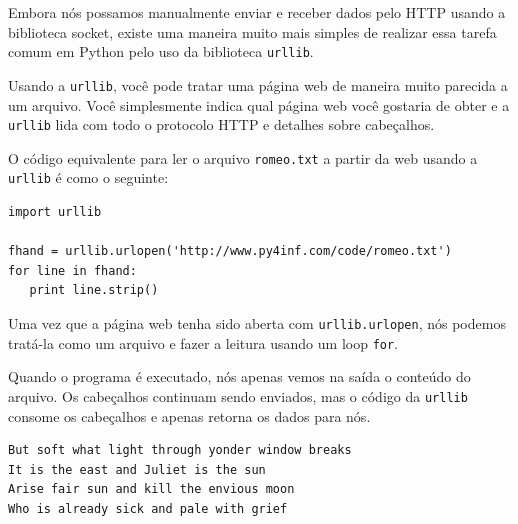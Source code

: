 Embora nós possamos manualmente enviar e receber dados pelo HTTP 
usando a biblioteca socket, existe uma maneira muito mais simples
de realizar essa tarefa comum em Python pelo uso da biblioteca
{\tt urllib}.

Usando a {\tt urllib}, você pode tratar uma página web
de maneira muito parecida a um arquivo. Você simplesmente
indica qual página web você gostaria de obter e a
{\tt urllib} lida com todo o protocolo HTTP e detalhes sobre
cabeçalhos.

O código equivalente para ler o arquivo {\tt romeo.txt} a partir
da web usando a {\tt urllib} é como o seguinte:

\beforeverb
\begin{verbatim}
import urllib

fhand = urllib.urlopen('http://www.py4inf.com/code/romeo.txt')
for line in fhand:
   print line.strip()
\end{verbatim}
\afterverb

Uma vez que a página web tenha sido aberta com 
{\tt urllib.urlopen}, nós podemos tratá-la
como um arquivo e fazer a leitura usando um loop
{\tt for}.   

Quando o programa é executado, nós apenas vemos na
saída o conteúdo do arquivo. Os cabeçalhos
continuam sendo enviados, mas o código da {\tt urllib}
consome os cabeçalhos e apenas retorna os dados para
nós.

\beforeverb
\begin{verbatim}
But soft what light through yonder window breaks
It is the east and Juliet is the sun
Arise fair sun and kill the envious moon
Who is already sick and pale with grief
\end{verbatim}
\afterverb

